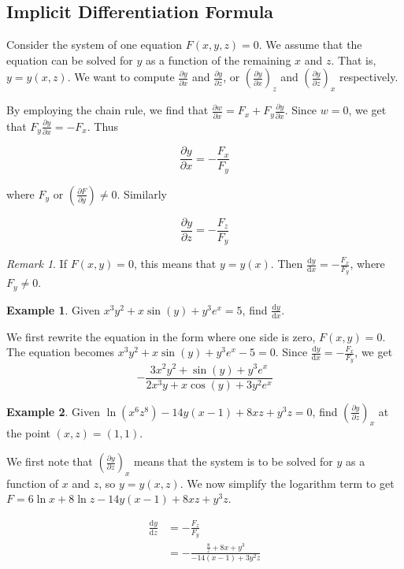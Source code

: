 \documentclass[11pt]{article}
\theoremstyle{plain} %
\theoremstyle{definition}
\theoremstyle{example}
\newtheorem*{example}{Example}
\theoremstyle{remark}
\newtheorem*{remark}{Remark}
\begin{document}
\subsection{Implicit Differentiation Formula}

Consider the system of one equation $F(x,y,z) = 0$. We assume that the equation can be solved for $y$ as a function of the remaining $x$ and $z$. That is, $y = y(x,z)$. We want to compute $\frac{\partial y}{\partial x}$ and $\frac{\partial y}{\partial z}$, or $\left(\frac{\partial y}{\partial x}\right)_z$ and $\left(\frac{\partial y}{\partial z}\right)_x$ respectively.

By employing the chain rule, we find that $\frac{\partial w}{\partial x} = F_x+F_y\frac{\partial y}{\partial x}$. Since $w=0$, we get that $F_y \frac{\partial y}{\partial x} = -F_x$. Thus

$$\frac{\partial y}{\partial x} = - \frac{F_x}{F_y} $$

where $F_y$ or $\left(\frac{\partial F}{\partial y}\right) \neq 0$. Similarly

$$\frac{\partial y}{\partial z} = - \frac{F_z}{F_y}$$

\begin{remark}
If $F(x,y) = 0$, this means that $y=y(x)$. Then $\frac{\mathrm d y}{\mathrm d x} = -\frac{F_x}{F_y}$, where $F_y \neq 0$.
\end{remark}

\begin{example}
Given $x^3y^2 +x\sin(y) + y^3e^x=5$, find $\frac{\mathrm d y}{\mathrm d x}$. 
\end{example}

We first rewrite the equation in the form where one side is zero, $F(x,y)=0$. The equation becomes $x^3y^2+ x\sin(y) + y^3e^x-5=0$. Since $\frac{\mathrm d y}{\mathrm d x} = -\frac{F_x}{F_y}$, we get $$-\frac{3x^2y^2+\sin(y)+y^3e^x}{2x^3y+x\cos(y)+3y^2e^x}$$

\begin{example}
Given $\ln\left(x^6z^8\right)-14y(x-1)+8xz+y^3z=0$, find $\left(\frac{\partial y}{\partial z}\right)_x$ at the point $(x,z) = (1,1)$. 
\end{example}

We first note that $\left(\frac{\partial y}{\partial z}\right)_x$ means that the system is to be solved for $y$ as a function of $x$ and $z$, so $y=y(x,z)$.  We now simplify the logarithm term to get $F=6\ln x+8\ln z-14y(x-1)+8xz+y^3z$. 

\begin{align*}
	\frac{\mathrm d y}{\mathrm d z} &= -\frac{F_z}{F_y}\\
	&= - \frac{\frac{8}{z} +8x+y^3}{-14(x-1)+3y^2z}
\end{align*}
\end{document}
